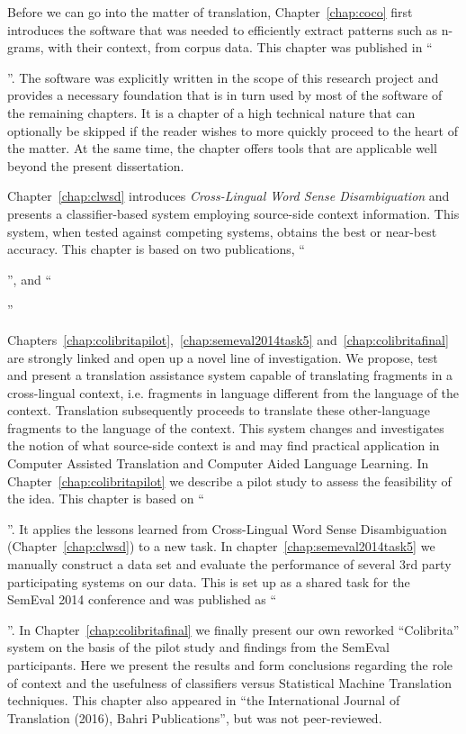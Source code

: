 {\nobibliography*
Before we can go into the matter of translation, Chapter~\ref{chap:coco} first introduces the software that was needed
to efficiently extract patterns such as n-grams, with their context, from corpus data. This chapter was published in
``{\footnotesize\begin{NoHyper}\end{NoHyper}}''. The software
was explicitly written in the scope of this research project and provides a necessary foundation that is in turn used by most of the
software of the remaining chapters. It is a chapter of a high technical nature that can optionally be skipped if the
reader wishes to more quickly proceed to the heart of the matter. At the same time, the chapter offers tools that are
applicable well beyond the present dissertation.

Chapter~\ref{chap:clwsd} introduces \emph{Cross-Lingual Word Sense
Disambiguation} and presents a classifier-based system employing source-side
context information. This system, when tested against competing systems, obtains the
best or near-best accuracy. This chapter is based on two publications,
``\begin{NoHyper}{\footnotesize{}}'', and ``{\footnotesize{}}\end{NoHyper}''

Chapters~\ref{chap:colibritapilot},~\ref{chap:semeval2014task5}
and~\ref{chap:colibritafinal} are strongly linked and open up a novel line of
investigation. We propose, test and present a translation assistance system
capable of translating fragments in a cross-lingual context, i.e. fragments in
language different from the language of the context. Translation subsequently
proceeds to translate these other-language fragments to the language of the context.
This system changes and investigates the notion of what source-side context is and may
find practical application in Computer Assisted Translation and Computer Aided
Language Learning. In Chapter~\ref{chap:colibritapilot} we describe a pilot study to
assess the feasibility of the idea. This chapter is based on
``{\footnotesize\begin{NoHyper}\end{NoHyper}}''. It applies the lessons learned from
Cross-Lingual Word Sense Disambiguation (Chapter~\ref{chap:clwsd}) to a new
task.  In chapter~\ref{chap:semeval2014task5} we
manually construct a data set and evaluate
the performance of several 3rd party participating systems on our data. This is set up as a shared task for the SemEval
2014 conference and was published as ``{\footnotesize\begin{NoHyper}\end{NoHyper}}''.
 In Chapter~\ref{chap:colibritafinal} we finally present our own reworked
``Colibrita'' system on the basis of the pilot study and findings from the
SemEval participants. Here we present the results and form conclusions
regarding the role of context and the usefulness of classifiers versus
Statistical Machine Translation techniques. This chapter also appeared in ``{\footnotesize the International Journal of Translation
(2016), Bahri Publications}'', but was not peer-reviewed.

}
